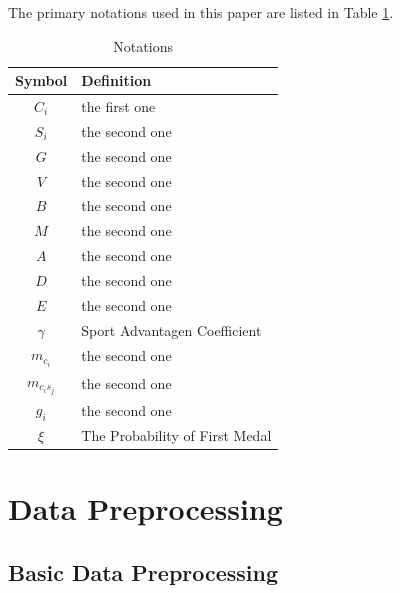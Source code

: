 \documentclass[12pt]{article}  %
\begin{document}
The primary notations used in this paper are listed in Table \ref{tb:notation}.

\begin{table}[!htbp]
\begin{center}
\caption{Notations}
\begin{tabular}{cl}
	\toprule
	\multicolumn{1}{m{3cm}}{\centering Symbol}
	&\multicolumn{1}{m{8cm}}{\centering Definition}\\
	\midrule
	$C_{i}$&the first one\\
	$S_{i}$&the second one\\
	$G$&the second one\\
	$V$&the second one\\
	$B$&the second one\\
	$M$&the second one\\
	$A$&the second one\\
	$D$&the second one\\
	$E$&the second one\\
    $\gamma$&Sport Advantagen Coefficient\\
  	$ m_{c_{i}}$ &the second one\\
	$ m_{c_{i} s_{j}}$ &the second one\\
    $g_{i}$&the second one\\
    $\xi$&The Probability of First Medal\\
	\bottomrule
\end{tabular}\label{tb:notation}
\end{center}
\end{table}

\section{Data Preprocessing}
\subsection{Basic Data Preprocessing}
\end{document}
